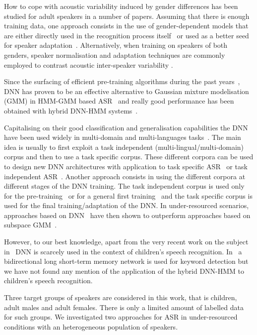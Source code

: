 \documentclass{nle}
\begin{document}
How to  cope with acoustic  variability induced by  gender differences
has been studied  for adult speakers in a  number of papers.  Assuming
that there is enough training  data, one  approach  consists in  the use  of
gender-dependent  models   that  are  either  directly   used  in  the
recognition process itself~\citep*{YocMor92,WooOdeValYou94} or used as a
better  seed for  speaker  adaptation~\citep*{LeeGau93}.  Alternatively,
when training  on speakers of both genders,  speaker normalisation and
adaptation  techniques  are  commonly  employed to  contrast  acoustic
inter-speaker variability \citep*{LeeRos96,Gal98}.

Since the  surfacing of  efficient pre-training algorithms  during the
past years~\citep*{hinton06,bengio07,erhan10,seide11}, DNN has proven to
be an  effective alternative to  Gaussian  mixture modelisation
(GMM) in  HMM-GMM based ASR~\citep*{bourlard94,hinton12} and  really good
performance    has     been    obtained    with     hybrid    DNN-HMM
systems~\citep*{dahl12,mohamed12}.

Capitalising  on their good  classification and  generalisation capabilities
the  DNN have  been used  widely in  multi-domain  and multi-languages
tasks~\citep*{sivadas04,stolcke06}.  The  main idea is  usually to first
exploit  a task  independent  (multi-lingual/multi-domain) corpus  and
then to  use a task specific  corpus.  These different  corpora can be
used to design new DNN architectures with application to task specific
ASR~\citep*{pinto09}  or  task  independent ASR~\citep*{bell13}.   Another
approach consists in using the different corpora at different stages of
the DNN  training. The  task independent corpus  is used only  for the
pre-training~\citep*{swietojanski12}      or       for      a  general    first
training~\citep*{vietbac10,thomas13} and the task specific corpus is used
for  the  final  training/adaptation  of the  DNN.   In  under-resourced
scenarios, approaches based on  DNN~\citep*{imseng13} have then shown to
outperform approaches based on  subspace GMM~\citep*{burget13}.

However, to our best knowledge, apart from the very recent work on the
subject in~\citet*{MatChe2014}  DNN is scarcely  used in the  context of
children's  speech recognition.   In~\citet*{Wollmer11}  a bidirectional
long short-term  memory network is  used for keyword detection  but we
have not found any mention of the application of the hybrid DNN-HMM to
children's speech recognition.

Three target groups  of speakers are considered in  this work, that is
children,  adult males  and adult  females.  There  is only  a limited
amount  of  labelled  data  for  such  groups.   We  investigated  two
approaches for ASR in under-resourced conditions with an heterogeneous
population of speakers.
\end{document}
